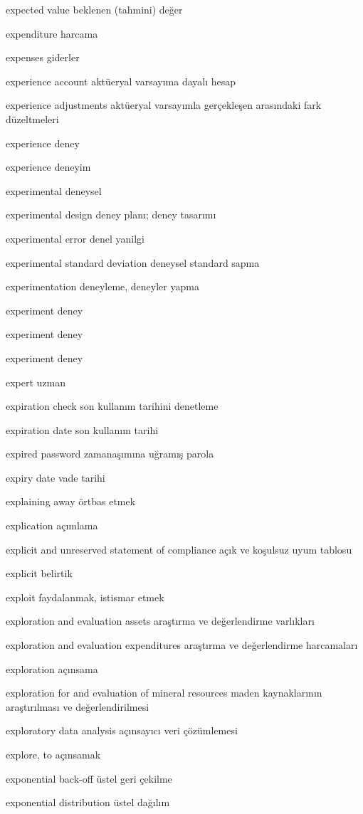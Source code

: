 \documentclass[12pt,fleqn]{article}\usepackage{../../common}
\begin{document}
expected value beklenen (tahmini) değer

expenditure harcama

expenses giderler

experience account aktüeryal varsayıma dayalı hesap

experience adjustments aktüeryal varsayımla gerçekleşen arasındaki fark düzeltmeleri

experience deney

experience deneyim

experimental deneysel

experimental design deney planı; deney tasarımı

experimental error denel yanilgi

experimental standard deviation deneysel standard sapma

experimentation deneyleme, deneyler yapma

experiment deney

experiment deney

experiment deney

expert uzman

expiration check son kullanım tarihini denetleme

expiration date son kullanım tarihi

expired password zamanaşımına uğramış parola

expiry date vade tarihi

explaining away örtbas etmek

explication açımlama

explicit and unreserved statement of compliance açık ve koşulsuz uyum tablosu

explicit belirtik

exploit faydalanmak, istismar etmek

exploration and evaluation assets araştırma ve değerlendirme varlıkları

exploration and evaluation expenditures araştırma ve değerlendirme harcamaları

exploration açınsama

exploration for and evaluation of mineral resources maden kaynaklarının araştırılması ve değerlendirilmesi

exploratory data analysis açınsayıcı veri çözümlemesi

explore, to açınsamak

exponential back-off üstel geri çekilme

exponential distribution üstel dağılım
\end{document}

